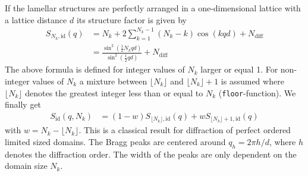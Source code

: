 If the lamellar structures are perfectly arranged in a one-dimensional lattice with a lattice distance $d$ its structure factor is given by
\begin{align}
  S_{N_k,\mathrm{id}}(q) &= N_k+2\sum_{k=1}^{N_k-1} (N_k-k)\cos(kqd) \label{eq:PerfectFiniteStackMonoSum} +N_\mathrm{diff}\\
       & = \frac{\sin^2\left(\frac12 N_kqd\right)}{\sin^2\left(\frac12 qd\right)} +N_\mathrm{diff}
\end{align}
The above formula is defined for integer values of $N_k$ larger or equal 1. For non-integer values of $N_k$ a mixture between $\lfloor N_k\rfloor$ and $\lfloor N_k\rfloor+1$ is assumed where $\lfloor N_k \rfloor$ denotes the greatest integer less than or equal to $N_k$ (\texttt{\texttt{floor}}-function). We finally get
\begin{align} \label{eq:continuesSQid}
S_\mathrm{id}(q,N_k) &= (1-w)S_{\lfloor N_k\rfloor,\mathrm{id}}(q) + w S_{\lfloor N_k\rfloor+1,\mathrm{id}}(q)
\end{align}
with $w=N_k-\lfloor N_k\rfloor$. This is a classical result for diffraction of perfect ordered limited sized domains.
The Bragg peaks are centered around $q_h=2\pi h/d$, where $h$ denotes
the diffraction order. The width of the peaks are only dependent on the domain size $N_k$.

